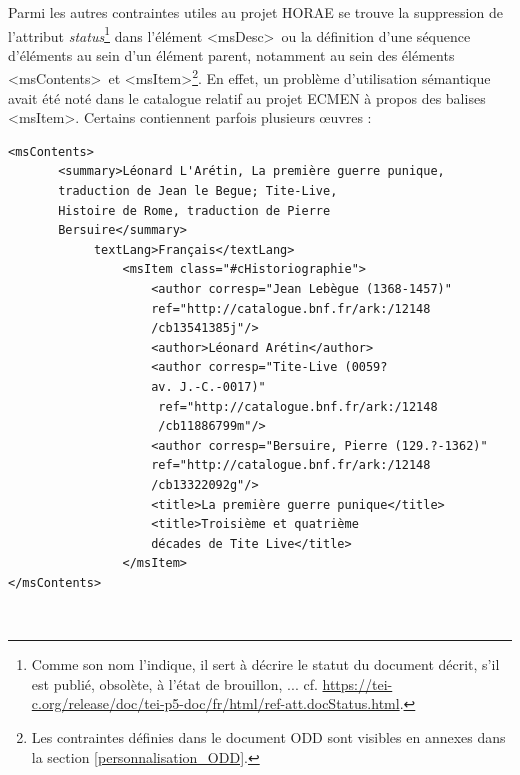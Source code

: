 \documentclass[a4paper,12pt,twoside]{book}
\begin{document}
	Parmi les autres contraintes utiles au projet HORAE se trouve la suppression de l'attribut \textit{status}\footnote{Comme son nom l'indique, il sert à décrire le statut du document décrit, s'il est publié, obsolète, à l'état de brouillon, ... cf. \url{https://tei-c.org/release/doc/tei-p5-doc/fr/html/ref-att.docStatus.html}.} dans l'élément \textless msDesc\textgreater~ou la définition d'une séquence d'éléments au sein d'un élément parent, notamment au sein des éléments \textless msContents\textgreater~et \textless msItem\textgreater \footnote{Les contraintes définies dans le document ODD sont visibles en annexes dans la section \ref{personnalisation_ODD}.}. En effet, un problème d'utilisation sémantique avait été noté dans le catalogue relatif au projet ECMEN à propos des balises \textless msItem\textgreater . Certains contiennent parfois plusieurs œuvres :
	\begin{verbatim}
<msContents>
       <summary>Léonard L'Arétin, La première guerre punique,
       traduction de Jean le Begue; Tite-Live, 
       Histoire de Rome, traduction de Pierre 
       Bersuire</summary>
            textLang>Français</textLang>
                <msItem class="#cHistoriographie">
                    <author corresp="Jean Lebègue (1368-1457)"
                    ref="http://catalogue.bnf.fr/ark:/12148
                    /cb13541385j"/>
                    <author>Léonard Arétin</author>
                    <author corresp="Tite-Live (0059? 
                    av. J.-C.-0017)"
                     ref="http://catalogue.bnf.fr/ark:/12148
                     /cb11886799m"/>
                    <author corresp="Bersuire, Pierre (129.?-1362)"
                    ref="http://catalogue.bnf.fr/ark:/12148
                    /cb13322092g"/>
                    <title>La première guerre punique</title>
                    <title>Troisième et quatrième 
                    décades de Tite Live</title>
                </msItem>
</msContents>
	\end{verbatim}\\
	
\end{document}
